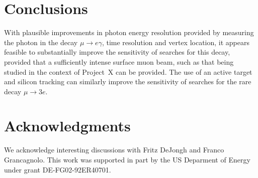 \section{Conclusions}
\label{conclusions}

With plausible improvements in photon energy resolution provided by measuring the photon in the decay $\mu \to e \gamma$, time resolution and vertex location, it appears feasible to substantially improve the sensitivity of searches for this decay, provided that a sufficiently intense surface muon beam, such as that being studied in the context of Project~X can be provided. The use of an active target and silicon tracking can similarly improve the sensitivity of searches for the rare decay $\mu \to 3e$.

\section{Acknowledgments}
\label{ack}

We acknowledge interesting discussions with Fritz DeJongh and Franco Grancagnolo.
This work was supported in part by the US Deparment of Energy under grant DE-FG02-92ER40701.

